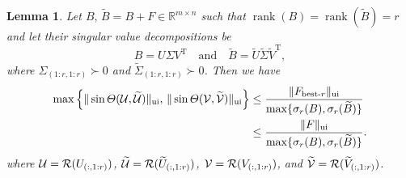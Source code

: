\documentclass[11pt]{article}
\def\bbR{\mathbb{R}}
\def\cR{{\cal R}}
\def\cU{{\cal U}}
\def\cV{{\cal V}}
\DeclareMathOperator{\rank}{rank}
\DeclareMathOperator{\T}{T}
\DeclareMathOperator{\UI}{ui}
\def\wtd{\widetilde}
\def\bestr{\mbox{\scriptsize\rm best-$r$}}
\newtheorem{lemma}{Lemma}[section]
\theoremstyle{definition}
\numberwithin{equation}{section}
\numberwithin{figure}{section}
\numberwithin{table}{section}
\begin{document}
\begin{lemma}\label{lm:SVD-pert:wedin}
Let $B,\,\wtd B=B+F\in\bbR^{m\times n}$ such that $\rank(B)=\rank(\wtd B)=r$ and let
their singular value decompositions be
\begin{equation}\label{eq:Bsvd}
    B=U\Sigma V^{\T}\quad\mbox{and}\quad
\wtd B=\wtd U\wtd\Sigma \wtd V^{\T},
\end{equation}
where $\Sigma_{(1:r,1:r)}\succ 0$ and $\wtd\Sigma_{(1:r,1:r)}\succ 0$.
Then we have
\begin{subequations}\label{eq:sin}
\begin{align}
\max\left\{\|\sin\Theta(\cU,\wtd\cU)\|_{\UI},\,\|\sin\Theta(\cV,\wtd\cV)\|_{\UI}\right\}
                &\le\frac{\|F_{\bestr}\|_{\UI}}{\max\{\sigma_r(B),\sigma_r(\wtd B)\}} \label{eq:sin-a} \\
                &\le\frac{\|F\|_{\UI}}{\max\{\sigma_r(B),\sigma_r(\wtd B)\}}. \label{eq:sin-b}
\end{align}
\end{subequations}
where $\cU=\cR(U_{(:,1:r)})$,
$\wtd\cU=\cR(\wtd U_{(:,1:r)})$,
$\cV=\cR(V_{(:,1:r)})$, and
$\wtd\cV=\cR(\wtd V_{(:,1:r)})$.
\end{lemma}
\end{document}
